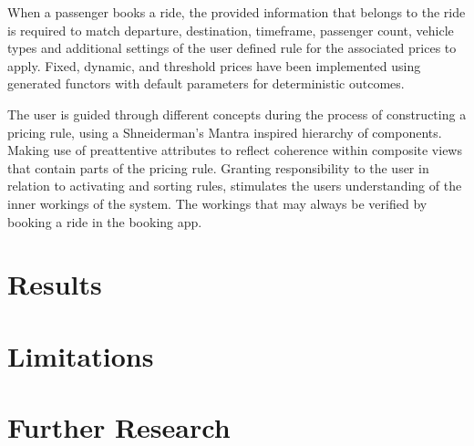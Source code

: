 When a passenger books a ride, the provided information that belongs to the ride is required to match departure, destination, timeframe, passenger count, vehicle types and additional settings of the user defined rule for the associated prices to apply. Fixed, dynamic, and threshold prices have been implemented using generated functors with default parameters for deterministic outcomes.

The user is guided through different concepts during the process of constructing a pricing rule, using a Shneiderman's Mantra inspired hierarchy of components. Making use of preattentive attributes to reflect coherence within composite views that contain parts of the pricing rule. Granting responsibility to the user in relation to activating and sorting rules, stimulates the users understanding of the inner workings of the system. The workings that may always be verified by booking a ride in the booking app.



\section{Results}
\section{Limitations}
\section{Further Research}